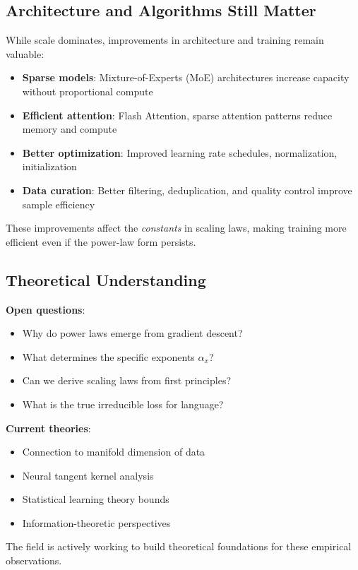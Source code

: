 \documentclass{article}
\begin{document}
\subsection{Architecture and Algorithms Still Matter}

While scale dominates, improvements in architecture and training remain valuable:

\begin{itemize}
\item \textbf{Sparse models}: Mixture-of-Experts (MoE) architectures increase capacity without proportional compute
\item \textbf{Efficient attention}: Flash Attention, sparse attention patterns reduce memory and compute
\item \textbf{Better optimization}: Improved learning rate schedules, normalization, initialization
\item \textbf{Data curation}: Better filtering, deduplication, and quality control improve sample efficiency
\end{itemize}

These improvements affect the \textit{constants} in scaling laws, making training more efficient even if the power-law form persists.

\subsection{Theoretical Understanding}

\textbf{Open questions}:
\begin{itemize}
\item Why do power laws emerge from gradient descent?
\item What determines the specific exponents $\alpha_x$?
\item Can we derive scaling laws from first principles?
\item What is the true irreducible loss for language?
\end{itemize}

\textbf{Current theories}:
\begin{itemize}
\item Connection to manifold dimension of data
\item Neural tangent kernel analysis
\item Statistical learning theory bounds
\item Information-theoretic perspectives
\end{itemize}

The field is actively working to build theoretical foundations for these empirical observations.
\end{document}
